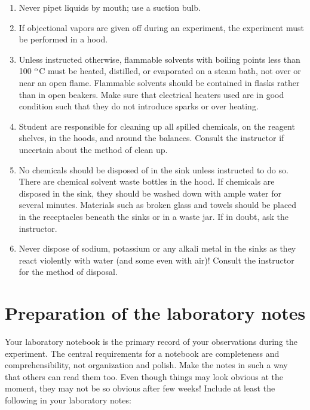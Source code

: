 \documentclass[byrevtex,amssymb,aps,pra,floatfix,letterpaper]{revtex4}
\begin{document}
\begin{enumerate}
\begin{enumerate}
\item Never pipet liquids by mouth; use a suction bulb.
\item If objectional vapors are given off during an experiment, the experiment must be performed in a hood.
\item Unless instructed otherwise, flammable solvents with boiling points less than 100 $^\textnormal{o}$C must be heated, distilled, or evaporated on a steam bath, not over or near an open flame. Flammable solvents should be contained in flasks rather than in open beakers. Make sure that electrical heaters used are in good condition such that they do not introduce sparks or over heating.
\item Student are responsible for cleaning up all spilled chemicals, on the reagent shelves, in the hoods, and around the balances. Consult the instructor if uncertain about the method of clean up.
\item No chemicals should be disposed of in the sink unless instructed to do so. There are chemical solvent waste bottles in the hood. If chemicals are disposed in the sink, they should be washed down with ample water for several minutes. Materials such as broken glass and towels should be placed in the receptacles beneath the sinks or in a waste jar. If in doubt, ask the instructor.
\item Never dispose of sodium, potassium or any alkali metal in the sinks as they react violently with water (and some even with air)! Consult the instructor for the method of disposal.
\end{enumerate}
\end{enumerate}

\section{Preparation of the laboratory notes}
\label{sec3}

Your laboratory notebook is the primary record of your observations during the experiment. The central requirements for a notebook are completeness and comprehensibility, not organization and polish. Make the notes in such a way that others can read them too. Even though things may look obvious at the moment, they may not be so obvious after few weeks! Include at least the following in your laboratory notes:
\end{document}
